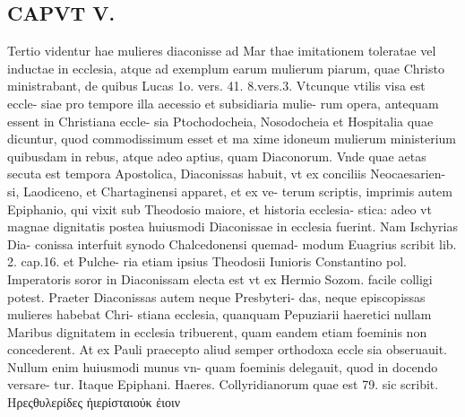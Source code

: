 \documentclass{article}
\begin{document}
\begin{pages}
\section*{CAPVT  V. }
\marginpar{[ p.273 ]}\pstart Tertio videntur hae mulieres diaconisse ad Mar thae imitationem toleratae vel inductae in ecclesia, atque ad exemplum earum mulierum piarum, quae Christo ministrabant, de quibus Lucas 1o. vers. 41. 8.vers.3. Vtcunque vtilis visa est eccle- siae pro tempore illa aecessio et subsidiaria mulie- rum opera, antequam essent in Christiana eccle- sia Ptochodocheia, Nosodocheia et Hospitalia quae dicuntur, quod commodissimum esset et ma xime idoneum mulierum ministerium quibusdam in rebus, atque adeo aptius, quam Diaconorum. Vnde quae aetas secuta est tempora Apostolica, Diaconissas habuit, vt ex conciliis Neocaesarien- si, Laodiceno, et Chartaginensi apparet, et ex ve- terum scriptis, imprimis autem Epiphanio, qui vixit sub Theodosio maiore, et historia ecclesia- stica: adeo vt magnae dignitatis postea huiusmodi Diaconissae in ecclesia fuerint. Nam Ischyrias Dia- conissa interfuit synodo Chalcedonensi quemad- modum Euagrius scribit lib. 2. cap.16. et Pulche- ria etiam ipsius Theodosii Iunioris Constantino pol. Imperatoris soror in Diaconissam electa est vt ex Hermio Sozom. facile colligi potest. Praeter Diaconissas autem neque Presbyteri- das, neque episcopissas mulieres habebat Chri- stiana ecclesia, quanquam Pepuziarii haeretici nullam Maribus dignitatem in ecclesia tribuerent, quam eandem etiam foeminis non concederent. At ex Pauli praecepto aliud semper orthodoxa eccle sia obseruauit. Nullum enim huiusmodi munus vn- quam foeminis delegauit, quod in docendo versare- tur. Itaque Epiphani. Haeres. Collyridianorum quae est 79. sic scribit. Hρεςθυλερίδες ἠιερίσταιούκ ἐιοιν  \pend

\end{pages}
\end{document}
